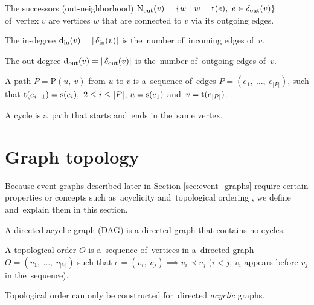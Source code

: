 \begin{definition}
The successors (out-neighborhood) $\operatorname{N_{out}}(v) = \{w\ |\ w = \operatorname{t}(e),\ e \in \operatorname{\delta_{out}}(v)\}$ of~vertex $v$ are vertices $w$ that are connected to $v$ via its outgoing edges.
\end{definition}

\begin{definition}
The in-degree $\operatorname{d_{in}}(v) = |\operatorname{\delta_{in}}(v)|$ is the~number of~incoming edges of~$v$.
\end{definition}

\begin{definition}
The out-degree $\operatorname{d_{out}}(v) = |\operatorname{\delta_{out}}(v)|$ is the~number of~outgoing edges of~$v$.
\end{definition}

\begin{definition}
A path $P = \mathrm{P}(u,\ v)$ from $u$ to $v$ is a~sequence of~edges $P = (e_1,\ \dots,\ e_{|P|})$, such that $\operatorname{t}(e_{i-1}) = \operatorname{s}(e_i),\ 2 \leq i \leq |P|$, $u = \operatorname{s}(e_1)$ and~$v = \operatorname{t}(e_{|P|})$.
\end{definition}

\begin{definition}
A cycle is a~path that starts and~ends in the~same vertex.
\end{definition}

\section{Graph topology}
Because event graphs described later in Section \ref{sec:event_graphs} require certain properties or concepts such as~acyclicity and~topological ordering \cite{BangJensen2008}, we define and~explain them in this section.

\begin{definition}
A directed acyclic graph (DAG) is a directed graph that contains no cycles.
\end{definition}

\begin{definition}
A topological order $O$ is a~sequence of~vertices in a~directed graph $O = (v_1,\ \dots,\ v_{|V|})$ such that $e = (v_i,\ v_j) \implies v_i \prec v_j$ ($i < j$, $v_i$ appears before $v_j$ in the~sequence).
\end{definition}

\begin{theorem}
Topological order can only be constructed for~directed \emph{acyclic} graphs.
\end{theorem}

